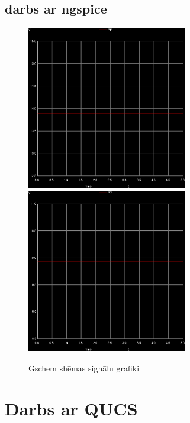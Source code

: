 \documentclass{report}
\begin{document}
\subsection{darbs ar ngspice}
\begin{figure}[h]
\includegraphics[width=7cm]{011.ps}
\includegraphics[width=7cm]{022.ps}
\caption{Gschem shēmas signālu grafiki }
\label{3}
\end{figure}


\section{Darbs ar QUCS}
\end{document}
